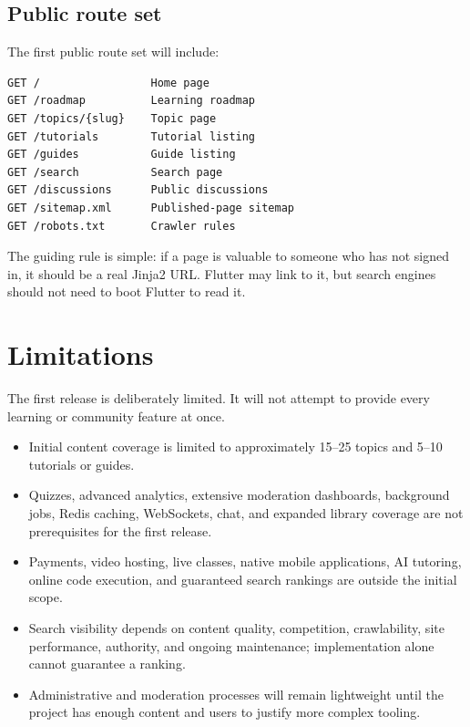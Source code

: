 \documentclass[11pt,a4paper]{article}
\begin{document}
\subsection{Public route set}

The first public route set will include:

\begin{lstlisting}
GET /                 Home page
GET /roadmap          Learning roadmap
GET /topics/{slug}    Topic page
GET /tutorials        Tutorial listing
GET /guides           Guide listing
GET /search           Search page
GET /discussions      Public discussions
GET /sitemap.xml      Published-page sitemap
GET /robots.txt       Crawler rules
\end{lstlisting}

The guiding rule is simple: if a page is valuable to someone who has not signed
in, it should be a real Jinja2 URL. Flutter may link to it, but search engines
should not need to boot Flutter to read it.

\section{Limitations}

The first release is deliberately limited. It will not attempt to provide every
learning or community feature at once.

\begin{itemize}
  \item Initial content coverage is limited to approximately 15--25 topics and
        5--10 tutorials or guides.
  \item Quizzes, advanced analytics, extensive moderation dashboards, background
        jobs, Redis caching, WebSockets, chat, and expanded library coverage are
        not prerequisites for the first release.
  \item Payments, video hosting, live classes, native mobile applications, AI
        tutoring, online code execution, and guaranteed search rankings are outside
        the initial scope.
  \item Search visibility depends on content quality, competition, crawlability,
        site performance, authority, and ongoing maintenance; implementation alone
        cannot guarantee a ranking.
  \item Administrative and moderation processes will remain lightweight until the
        project has enough content and users to justify more complex tooling.
\end{itemize}
\end{document}
